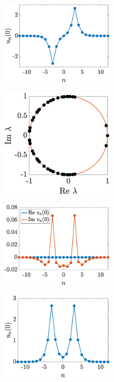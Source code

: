\documentclass[12pt,reqno]{amsart}
\theoremstyle{definition}
\begin{document}
\begin{figure}
	\begin{center}
	\begin{subfigure}{0.3\linewidth}
		\caption{}
		\includegraphics[width=5.5cm]{doubleun0.eps} \hspace{-0.5cm}
		\label{fig:doublea}
	\end{subfigure}
	\begin{subfigure}{0.3\linewidth}
		\caption{}
		\includegraphics[width=5.5cm]{doublespec.eps} \hspace{-0.5cm}
		\label{fig:doubleb}
	\end{subfigure}
	\begin{subfigure}{0.3\linewidth}
		\caption{}
		\includegraphics[width=5.5cm]{doubleinteig.eps} 
		\label{fig:doublec}
	\end{subfigure}
	\begin{subfigure}{0.3\linewidth}
		\caption{}
		\includegraphics[width=5.5cm]{doubleppun0.eps} \hspace{-0.5cm}

\end{subfigure}
\end{center}
\end{figure}
\end{document}
